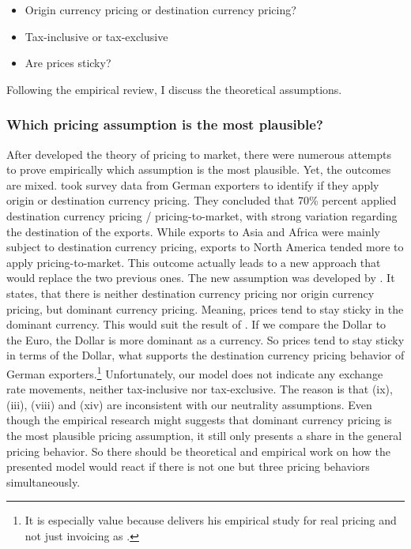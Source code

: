 \begin{itemize}
    \item Origin currency pricing or destination currency pricing?
    \item Tax-inclusive or tax-exclusive
    \item Are prices sticky?
\end{itemize}

Following the empirical review, I discuss the theoretical assumptions. 

\subsubsection{Which pricing assumption is the most plausible?}
After \cite{krugman1986pricing} developed the theory of pricing to market, there were numerous attempts to prove empirically which assumption is the most plausible. Yet, the outcomes are mixed. \cite{fendel2008local} took survey data from German exporters to identify if they apply origin or destination currency pricing. They concluded that 70\% percent applied destination currency pricing / pricing-to-market, with strong variation regarding the destination of the exports. While exports to Asia and Africa were mainly subject to destination currency pricing, exports to North America tended more to apply pricing-to-market. This outcome actually leads to a new approach that would replace the two previous ones. The new assumption was developed by \cite{casas2017dominant}. It states, that there is neither destination currency pricing nor origin currency pricing, but dominant currency pricing. Meaning, prices tend to stay sticky in the dominant currency. This would suit the result of \cite{fendel2008local}. If we compare the Dollar to the Euro, the Dollar is more dominant as a currency. So prices tend to stay sticky in terms of the Dollar, what supports the destination currency pricing behavior of German exporters.\footnote{It is especially value because \cite{fendel2008local} delivers his empirical study for real pricing and not just invoicing as \cite{feentra}.} Unfortunately, our model does not indicate any exchange rate movements, neither tax-inclusive nor tax-exclusive. The reason is that (ix), (iii), (viii) and (xiv) are inconsistent with our neutrality assumptions. Even though the empirical research might suggests that dominant currency pricing is the most plausible pricing assumption, it still only presents a share in the general pricing behavior. So there should be theoretical and empirical work on how the presented model would react if there is not one but three pricing behaviors simultaneously. 



